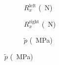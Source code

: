 \begin{figure}[htbp!]
  \captionsetup{font=footnotesize}
  \centering
  \begin{subfigure}[b]{0.31\textwidth}
    \caption*{$R_x^\text{left}$ (\SI{}{\newton})}
  \end{subfigure}
  \begin{subfigure}[b]{0.31\textwidth}
    \caption*{$R_x^\text{right}$ (\SI{}{\newton})}
  \end{subfigure}
  \begin{subfigure}[b]{0.31\textwidth}
    \caption*{$\widetilde{p}$ (\SI{}{\mega\pascal})}
  \end{subfigure}
  

\end{figure}
